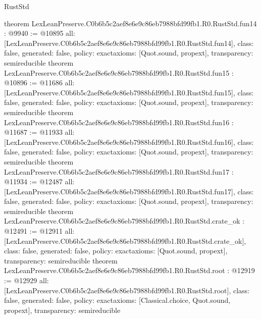 \begin{lexlean}{RustStd}
\begin{coremodule}
{}
theorem LexLeanPreserve.C0b6b5c2aef8e6e9c86eb7988bfd99fb1.R0.RustStd.fun14 : @9940 := @10895 {
  all: [LexLeanPreserve.C0b6b5c2aef8e6e9c86eb7988bfd99fb1.R0.RustStd.fun14],
  class: false,
  generated: false,
  policy: exact{axioms: [Quot.sound, propext]},
  transparency: semireducible
}
theorem LexLeanPreserve.C0b6b5c2aef8e6e9c86eb7988bfd99fb1.R0.RustStd.fun15 : @10896 := @11686 {
  all: [LexLeanPreserve.C0b6b5c2aef8e6e9c86eb7988bfd99fb1.R0.RustStd.fun15],
  class: false,
  generated: false,
  policy: exact{axioms: [Quot.sound, propext]},
  transparency: semireducible
}
theorem LexLeanPreserve.C0b6b5c2aef8e6e9c86eb7988bfd99fb1.R0.RustStd.fun16 : @11687 := @11933 {
  all: [LexLeanPreserve.C0b6b5c2aef8e6e9c86eb7988bfd99fb1.R0.RustStd.fun16],
  class: false,
  generated: false,
  policy: exact{axioms: [Quot.sound, propext]},
  transparency: semireducible
}
theorem LexLeanPreserve.C0b6b5c2aef8e6e9c86eb7988bfd99fb1.R0.RustStd.fun17 : @11934 := @12487 {
  all: [LexLeanPreserve.C0b6b5c2aef8e6e9c86eb7988bfd99fb1.R0.RustStd.fun17],
  class: false,
  generated: false,
  policy: exact{axioms: [Quot.sound, propext]},
  transparency: semireducible
}
theorem LexLeanPreserve.C0b6b5c2aef8e6e9c86eb7988bfd99fb1.R0.RustStd.crate_ok : @12491 := @12911 {
  all: [LexLeanPreserve.C0b6b5c2aef8e6e9c86eb7988bfd99fb1.R0.RustStd.crate_ok],
  class: false,
  generated: false,
  policy: exact{axioms: [Quot.sound, propext]},
  transparency: semireducible
}
theorem LexLeanPreserve.C0b6b5c2aef8e6e9c86eb7988bfd99fb1.R0.RustStd.root : @12919 := @12929 {
  all: [LexLeanPreserve.C0b6b5c2aef8e6e9c86eb7988bfd99fb1.R0.RustStd.root],
  class: false,
  generated: false,
  policy: exact{axioms: [Classical.choice, Quot.sound, propext]},
  transparency: semireducible
}


\end{coremodule}
\end{lexlean}
